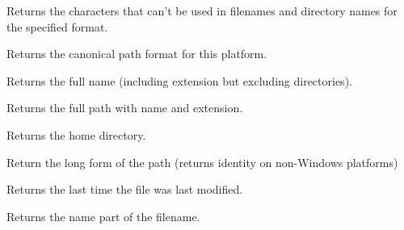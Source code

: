 \label{wxfilenamegetforbiddenchars}


Returns the characters that can't be used in filenames and directory names for the specified format.


\label{wxfilenamegetformat}


Returns the canonical path format for this platform.


\label{wxfilenamegetfullname}


Returns the full name (including extension but excluding directories).


\label{wxfilenamegetfullpath}


Returns the full path with name and extension.


\label{wxfilenamegethomedir}


Returns the home directory.


\label{wxfilenamegetlongpath}


Return the long form of the path (returns identity on non-Windows platforms)


\label{wxfilenamegetmodificationtime}


Returns the last time the file was last modified.


\label{wxfilenamegetname}


Returns the name part of the filename.


\label{wxfilenamegetpath}


